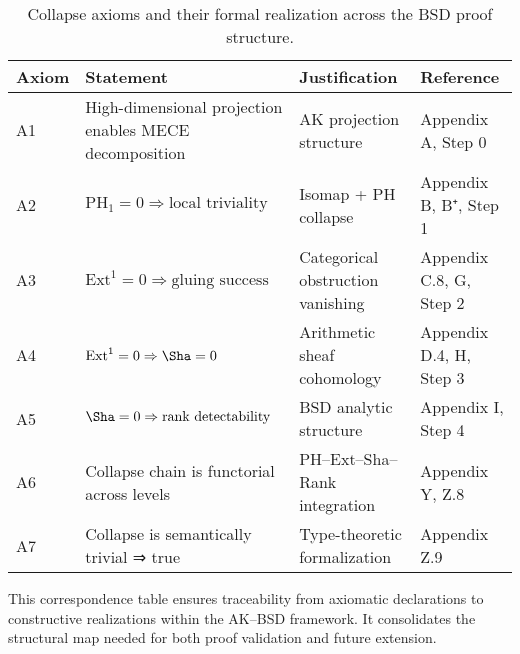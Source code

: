 \begin{table}[H]
\centering
\begin{tabular}{llll}
\toprule
\textbf{Axiom} & \textbf{Statement} & \textbf{Justification} & \textbf{Reference} \\
\midrule
A1 & High-dimensional projection enables MECE decomposition & AK projection structure & Appendix A, Step 0 \\
A2 & \( \mathrm{PH}_1 = 0 \Rightarrow \text{local triviality} \) & Isomap + PH collapse & Appendix B, B⁺, Step 1 \\
A3 & \( \mathrm{Ext}^1 = 0 \Rightarrow \text{gluing success} \) & Categorical obstruction vanishing & Appendix C.8, G, Step 2 \\
A4 & \( \mathrm{Ext}^1 = 0 \Rightarrow \Sha = 0 \) & Arithmetic sheaf cohomology & Appendix D.4, H, Step 3 \\
A5 & \( \Sha = 0 \Rightarrow \text{rank detectability} \) & BSD analytic structure & Appendix I, Step 4 \\
A6 & Collapse chain is functorial across levels & PH–Ext–Sha–Rank integration & Appendix Y, Z.8 \\
A7 & Collapse is semantically trivial ⇒ true & Type-theoretic formalization & Appendix Z.9 \\
\bottomrule
\end{tabular}
\caption{Collapse axioms and their formal realization across the BSD proof structure.}
\end{table}

\begin{remark}
This correspondence table ensures traceability from axiomatic declarations  
to constructive realizations within the AK–BSD framework.  
It consolidates the structural map needed for both proof validation and future extension.
\end{remark}




